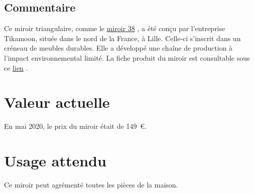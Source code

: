     \subsection* {Commentaire}
     Ce miroir triangulaire, comme le 
    \href{miroir38.xml}{miroir
                    38}
  , a été conçu par l’entreprise Tikamoon, située dans le nord de
                la France, à Lille. Celle-ci s’inscrit dans un créneau de meubles durables. Elle a
                développé une chaîne de production à l’impact environnemental limité.  La fiche produit du miroir est consultable sous ce 
    \href{https://www.tikamoon.com/art-miroir-triangulaire-en-m-tal-60-maho-2782.htm}{lien}
  . 
    \section* {Valeur actuelle}
    En mai 2020, le prix du miroir était de 149 €.
    \section* {Usage attendu}
     Ce miroir peut agrémenté toutes les pièces de la maison.   
  
